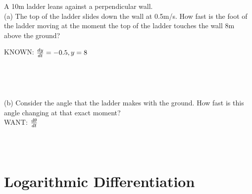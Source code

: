 \begin{exercise}\nonumber
    A 10m ladder leans against a perpendicular wall. \\

    (a) The top of the ladder slides down the wall at 0.5m/s. How fast is the foot of the ladder moving at the moment the top of the ladder touches the wall 8m above the ground? \\

    \begin{figure}[H]
        \centering
    \end{figure}

    KNOWN: $ {dy \over dt} = -0.5, y=8 $

    \begin{align}
        \\
        \\
        \\
        \\
        \\
        \\
        \\
        \\
    \end{align}

    (b) Consider the angle that the ladder makes with the ground. How fast is this angle changing at that exact moment? \\

    WANT: $ d\theta \over dt $

    \begin{align}
        \\
        \\
        \\
        \\
        \\
    \end{align}
\end{exercise}

\chapter{Logarithmic Differentiation}

